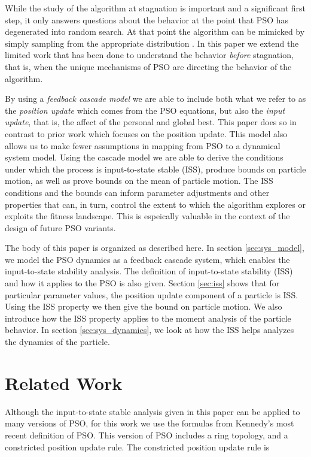 \documentclass{sig-alternate}
\begin{document}
While the study of the algorithm at stagnation is important and a significant first step, it only answers questions about the behavior at the point that PSO has degenerated into random search.
At that point the algorithm can be mimicked by simply sampling from the appropriate distribution \cite{5175367}.
In this paper we extend the limited work that has been done to understand
the behavior \emph{before} stagnation, that is, when the unique mechanisms of PSO are directing the behavior of the algorithm.

By using a \emph{feedback cascade model} we are able to include both what we refer to as the \emph{position update} which comes from the PSO equations, but also the \emph{input update}, that is, the affect of the personal and global best.
This paper does so in contrast to prior work which focuses on the position update.
This model also allows us to make fewer assumptions in mapping from PSO to a dynamical system model.
Using the cascade model we are able to derive the conditions under which the process is input-to-state stable (ISS)\cite{Jiang2001857}, produce bounds on particle motion, as well as prove bounds on the mean of particle motion.
The ISS conditions and the bounds can inform parameter adjustments and other properties that can, in turn, control the extent to which the algorithm explores or exploits the fitness landscape.
This is espeically valuable in the context of the design of future PSO variants. 

The body of this paper is organized as described here.
In section \ref{sec:sys_model}, we model the PSO dynamics as a feedback cascade system, which enables the input-to-state stability analysis.
The definition of input-to-state stability (ISS) and how it applies to the PSO is also given.
Section \ref{sec:iss} shows that for particular parameter values, the position update component of a particle is ISS. 
Using the ISS property we then give the bound on particle motion.
We also introduce how the ISS property applies to the moment analysis of the particle behavior.
In section \ref{sec:sys_dynamics}, we look at how the ISS helps analyzes the dynamics of the particle.

\section{Related Work}
\label{sec:relwork}

Although the input-to-state stable analysis given in this paper can be applied to many versions of PSO,
for this work we use the formulas from Kennedy's most recent definition of PSO\cite{4223164}.
This version of PSO includes a ring topology, and a constricted position update rule. 
The constricted position update rule is
\end{document}
